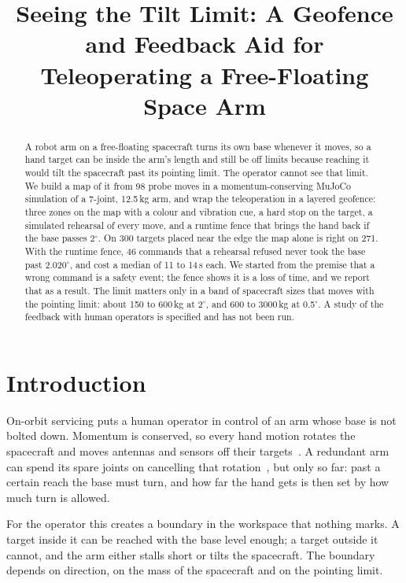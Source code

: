 \documentclass[conference]{IEEEtran}
\newcommand{\todo}[1]{\textcolor{red}{[TODO: #1]}}
\begin{document}
\title{Seeing the Tilt Limit: A Geofence and Feedback Aid for Teleoperating a Free-Floating Space Arm}
\author{\IEEEauthorblockN{\todo{five names}}}
\maketitle

\begin{abstract}
A robot arm on a free-floating spacecraft turns its own base whenever it moves, so a hand target can be
inside the arm's length and still be off limits because reaching it would tilt the spacecraft past its
pointing limit. The operator cannot see that limit. We build a map of it from 98 probe moves in a
momentum-conserving MuJoCo simulation of a 7-joint, 12.5\,kg arm, and wrap the teleoperation in a layered
geofence: three zones on the map with a colour and vibration cue, a hard stop on the target, a simulated
rehearsal of every move, and a runtime fence that brings the hand back if the base passes 2$^\circ$. On
300 targets placed near the edge the map alone is right on 271. With the runtime fence, 46 commands that
a rehearsal refused never took the base past 2.020$^\circ$, and cost a median of 11 to 14\,s each. We
started from the premise that a wrong command is a safety event; the fence shows it is a loss of time, and
we report that as a result. The limit matters only in a band of spacecraft sizes that moves with the
pointing limit: about 150 to 600\,kg at 2$^\circ$, and 600 to 3000\,kg at 0.5$^\circ$. A study of the
feedback with human operators is specified and has not been run.
\end{abstract}

\section{Introduction}
On-orbit servicing puts a human operator in control of an arm whose base is not bolted down. Momentum is
conserved, so every hand motion rotates the spacecraft and moves antennas and sensors off their
targets~\cite{dubowsky1993,umetani1989}. A redundant arm can spend its spare joints on cancelling that
rotation~\cite{nenchev1999,yoshida2001}, but only so far: past a certain reach the base must turn, and how
far the hand gets is then set by how much turn is allowed.

For the operator this creates a boundary in the workspace that nothing marks. A target inside it can be
reached with the base level enough; a target outside it cannot, and the arm either stalls short or tilts
the spacecraft. The boundary depends on direction, on the mass of the spacecraft and on the pointing limit.
\end{document}
